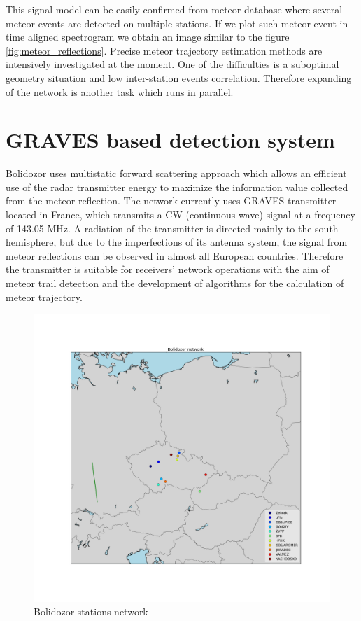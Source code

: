 \documentclass[twoside]{ctuthesis}
\theoremstyle{plain}
\theoremstyle{definition}
\theoremstyle{note}
\begin{document}
This signal model can be easily confirmed from meteor database where several meteor events are detected on multiple stations. If we plot such meteor event in time aligned spectrogram we obtain an image similar to the figure \ref{fig:meteor_reflections}.
Precise meteor trajectory estimation methods are intensively investigated at the moment.  One of the difficulties is a suboptimal geometry situation and low inter-station events correlation. Therefore expanding of the network is another task which runs in parallel. 


\section{GRAVES based detection system}

Bolidozor uses multistatic forward scattering approach which allows an efficient use of the radar transmitter energy  to maximize the information value collected from the meteor reflection.
The network currently uses GRAVES \cite{GRAVES_radar} transmitter located in France, which transmits a CW (continuous wave) signal at a frequency of 143.05 MHz. A radiation of the transmitter is directed mainly to the south hemisphere, but due to the imperfections of its antenna system, the signal from meteor reflections can be observed in almost all European countries. Therefore the transmitter is suitable for receivers' network operations with the aim of meteor trail detection and the development of algorithms for the calculation of meteor trajectory.

\begin{figure}
 \begin{center}
 \includegraphics[width=\linewidth]{./img/stanice_mapa.png}
 \caption{Bolidozor stations network}
  \label{fig:stanice_mapa} 
 \end{center}
\end{figure}
                   
\end{document}
